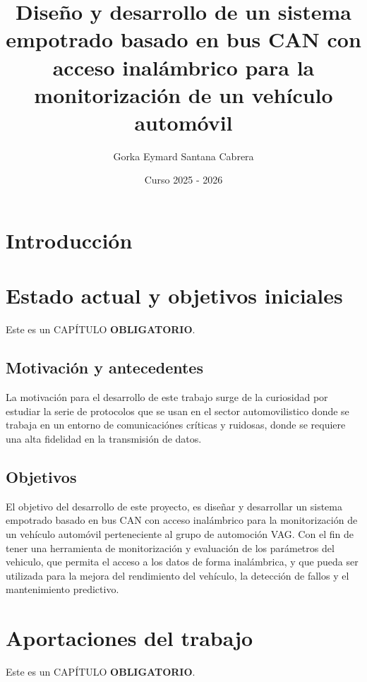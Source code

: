 \documentclass[oneside,12pt]{book}
\title{Diseño y desarrollo de un sistema empotrado basado en bus CAN con acceso inalámbrico para la monitorización de un vehículo automóvil}
\author{Gorka Eymard Santana Cabrera}
\date{Curso 2025 - 2026}
\begin{document}


%

\newpage
{}
%


\tableofcontents


\listoffigures

\listoftables


\clearpage
{}

\chapter{Introducción}


\chapter{Estado actual y objetivos iniciales}
%
Este es un CAPÍTULO \textbf{OBLIGATORIO}.
\section{Motivación y antecedentes}

La motivación para el desarrollo de este trabajo surge de la curiosidad por estudiar la serie de protocolos que se usan en el sector automovilistico donde se trabaja en un entorno de comunicaciónes críticas y ruidosas, donde se requiere una alta fidelidad en la transmisión de datos.\\

\section{Objetivos}

El objetivo del desarrollo de este proyecto, es diseñar y desarrollar un sistema empotrado basado en bus CAN con acceso inalámbrico para la monitorización de un vehículo automóvil perteneciente al grupo de automoción VAG. Con el fin de tener una herramienta de monitorización y evaluación de los parámetros del vehiculo, que permita el acceso a los datos de forma inalámbrica, y que pueda ser utilizada para la mejora del rendimiento del vehículo, la detección de fallos y el mantenimiento predictivo.

\chapter{Aportaciones del trabajo}
%
Este es un CAPÍTULO \textbf{OBLIGATORIO}.
\end{document}
